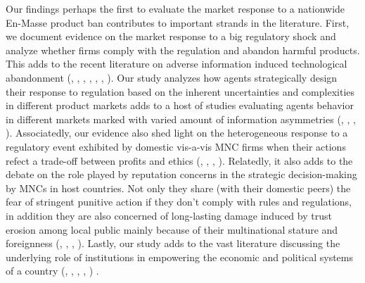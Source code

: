 \documentclass[AER]{AEA}
\theoremstyle{theorem}
\begin{document}
Our findings perhaps the first to evaluate the market response to a nationwide En-Masse product ban contributes to important strands in the literature. First, we document evidence on the market response to a big regulatory shock and analyze whether firms comply with the regulation and abandon harmful products. This adds to the recent literature on adverse information induced technological abandonment 
(\cite{finkelstein1985scientific}, \cite{greve1995jumping}, \cite{kennedy2011diffusion}, \cite{howard2012comparative}, \cite{agarwal2014abandoning}, \cite{greenwood2017and}, \cite{aggarwal2020science}). Our study analyzes how agents strategically design their response to regulation based on the inherent uncertainties and complexities in different product markets adds to a host of studies evaluating agents behavior in different markets marked with varied amount of information asymmetries (\cite{levitt2008market}, \cite{fong2005experts}, \cite{giannakas2002information}, \cite{alger2004theory}). Associatedly, our evidence also shed light on the heterogeneous response to a regulatory event exhibited by domestic vis-a-vis MNC firms when their actions refect a trade-off between profits and ethics (\cite{cheah2007corporate}, \cite{haunschild2004role}, \cite{jarrell1985impact}, \cite{rhee2006liability}). Relatedly, it also adds to the debate on the role played by reputation concerns in the strategic decision-making by MNCs in host countries. Not only they share (with their domestic peers) the fear of stringent punitive action if they don't comply with rules and regulations, in addition they are also concerned of long-lasting damage induced by trust erosion among local public mainly because of their multinational stature and foreignness (\cite{aggarwal2020science}, \cite{campbell2012multinationals}, \cite{zaheer1997dynamics}, \cite{zaheer1995overcoming}). Lastly, our study adds to the vast literature discussing the underlying role of institutions in empowering the economic and political systems of a country (\cite{banerjee1997theory}, \cite{bertrand2007obtaining}, \cite{fisman2004tax}, \cite{acemoglu2005unbundling}, \cite{acemoglu2005institutions}) .
\end{document}
